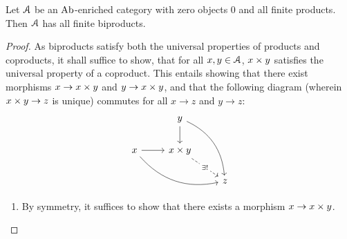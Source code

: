                 \begin{proposition} \label{prop: finite_biproduct_criterion}
                    Let $\mathcal{A}$ be an $\mathrm{Ab}$-enriched category with zero objects $0$ and all finite products. Then $\mathcal{A}$ has all finite biproducts. 
                \end{proposition}
                    \begin{proof}
                        As biproducts satisfy both the universal properties of products and coproducts, it shall suffice to show, that for all $x, y \in \mathcal{A}$, $x \x y$ satisfies the universal property of a coproduct. This entails showing that there exist morphisms $x \to x \x y$ and $y \to x \x y$, and that the following diagram (wherein $x \x y \to z$ is unique) commutes for all $x \to z$ and $y \to z$:
                            $$
                                \begin{tikzcd}
                                                                        & y \arrow[rdd, bend left] \arrow[d]                &   \\
                                    x \arrow[rrd, bend right] \arrow[r] & x \x y \arrow[rd, "\exists!" description, dashed] &   \\
                                                                        &                                                   & z
                                \end{tikzcd}
                            $$
                            \begin{enumerate}
                                \item By symmetry, it suffices to show that there exists a morphism $x \to x \x y$. 
                                

\end{enumerate}
\end{proof}
